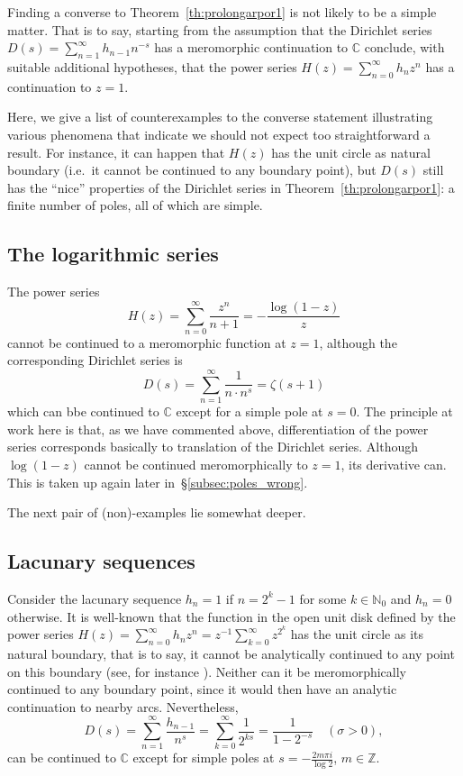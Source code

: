 \documentclass[11pt,a4paper]{amsart}
\newcommand{\N}{\mathbb{N}}
\newcommand{\Z}{\mathbb{Z}}
\newcommand{\C}{\mathbb{C}}
\theoremstyle{plain}
\theoremstyle{plain}
\theoremstyle{plain}
\theoremstyle{definition}
\theoremstyle{remark}
\begin{document}
Finding a converse to Theorem~\ref{th:prolongarpor1} is not likely to be a simple matter. That is to say, starting from the assumption that the Dirichlet series $D(s) = \sum_{n=1}^{\infty} h_{n-1} n^{-s}$ has a meromorphic continuation to $\C$ conclude, with suitable additional hypotheses, that the power series $H(z) = \sum_{n=0}^{\infty} h_{n} z^{n}$ has a continuation to $z=1$. 

Here, we give a list of counterexamples to the converse statement illustrating various phenomena that indicate we should not expect too straightforward a result. For instance, it can happen that $H(z)$ has the unit circle as natural boundary (i.e.\ it cannot be continued to any boundary point), but $D(s)$ still has the ``nice'' properties of the Dirichlet series in Theorem~\ref{th:prolongarpor1}: a finite number of poles, all of which are simple.

\subsection{The logarithmic series}
\label{subsec:log}

The power series
\[
  H(z) = \sum_{n=0}^{\infty}\frac{z^{n}}{n+1} = -\frac{\log(1-z)}{z}
\]
cannot be continued to a meromorphic function at $z=1$, although the corresponding Dirichlet series is
\[
  D(s) = \sum_{n=1}^{\infty}\frac{1}{n \cdot n^{s}} = \zeta(s+1)
\]
which can bbe continued to $\C$ except for a simple pole at $s=0$. The principle at work here is that, as we have commented above, differentiation of the power series corresponds basically to translation of the Dirichlet series. Although $\log(1-z)$ cannot be continued meromorphically to $z=1$, its derivative can. This is taken up again later in~\S\ref{subsec:poles_wrong}.


The next pair of (non)-examples lie somewhat deeper.


\subsection{Lacunary sequences}
\label{subsec:lacunary}

Consider the lacunary sequence $h_{n}=1$ if $n=2^k-1$ for some $k\in\N_{0}$ and $h_{n}=0$ otherwise. It is well-known that the function in the open unit disk defined by the power series $H(z) = \sum_{n=0}^{\infty} h_{n} z^{n} = z^{-1} \sum_{k=0}^{\infty} z^{2^{k}}$ has the unit circle as its natural boundary, that is to say, it cannot be analytically continued to any point on this boundary (see, for instance \cite[Chapter XVI]{Rudin}). Neither can it be meromorphically continued to any boundary point, since it would then have an analytic continuation to nearby arcs. Nevertheless,
\[
  D(s) = \sum_{n=1}^{\infty} \frac{h_{n-1}}{n^{s}}
  = \sum_{k=0}^{\infty} \frac{1}{2^{ks}}    
  = \frac{1}{1-2^{-s}}
  \quad (\sigma > 0),
\]
can be continued to $\C$ except for simple poles at $s=-\frac{2m\pi i}{\log 2}$, $m\in\Z$.
\end{document}
